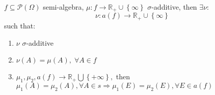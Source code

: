 \begin{theorem}[Extension]
	$ f \subseteq \mathcal{P}\left(\Omega\right) $ semi-algebra, $ \mu  :f \to {\mathbb{R}_ + } \cup \left\{ \infty  \right\}$ {\color{blue}$ \sigma $-}additive, then $ \exists \nu: $ 
	\begin{equation}
	\nu :a\left( f \right) \to {\mathbb{R}_ + } \cup \left\{ \infty  \right\}
	\end{equation}
	such that:
	\begin{enumerate}
		\item $ \nu $ {\color{blue}$ \sigma $-}additive
		\item $\nu \left( A \right) = \mu \left( A \right),\;\forall A \in f$
		\item $ \mu_{1},\mu_{2}, a\left(f\right) \to \mathbb{R}_{+} \bigcup \left\{ { + \infty } \right\}, $ then $ {\mu _1}\left( A \right) = {\mu _2}\left( A \right),\forall A \in s \Rightarrow {\mu _1}\left( E \right) = {\mu _2}\left( E \right),\forall E \in a\left( f \right) $	
	\end{enumerate}
\label{thm3.1}
\end{theorem}
